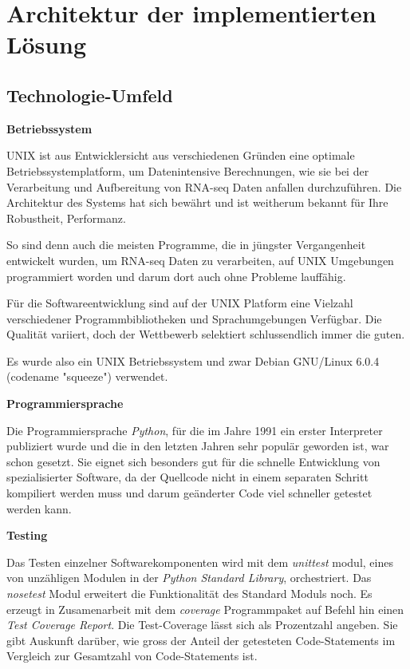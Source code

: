 \documentclass[a4paper]{thesis}
\begin{document}
\section{Architektur der implementierten Lösung}

\subsection{Technologie-Umfeld}

\textbf{Betriebssystem}

UNIX ist aus Entwicklersicht aus verschiedenen Gründen eine optimale
Betriebssystemplatform, um Datenintensive Berechnungen, wie sie bei
der Verarbeitung und Aufbereitung von RNA-seq Daten anfallen durchzuführen.
Die Architektur des Systems hat sich bewährt und ist weitherum bekannt
für Ihre Robustheit, Performanz.

So sind denn auch die meisten Programme, die in jüngster Vergangenheit
entwickelt wurden, um RNA-seq Daten zu verarbeiten, auf UNIX Umgebungen
programmiert worden und darum dort auch ohne Probleme lauffähig.

Für die Softwareentwicklung sind auf der UNIX Platform
eine Vielzahl verschiedener Programmbibliotheken und Sprachumgebungen
Verfügbar. Die Qualität variiert, doch der Wettbewerb selektiert
schlussendlich immer die guten.

Es wurde also ein UNIX Betriebssystem und zwar Debian GNU/Linux 6.0.4
(codename "squeeze") verwendet.

\textbf{Programmiersprache}

Die Programmiersprache {\em Python}, für die im Jahre 1991 ein erster
Interpreter publiziert wurde und die in den letzten Jahren sehr
populär geworden ist, war schon gesetzt. Sie eignet sich besonders gut
für die schnelle Entwicklung von spezialisierter Software, da der
Quellcode nicht in einem separaten Schritt kompiliert werden muss und
darum geänderter Code viel schneller getestet werden kann.

\textbf{Testing}

Das Testen einzelner Softwarekomponenten wird mit dem {\em unittest} modul,
eines von unzähligen Modulen in der {\em Python Standard Library},
orchestriert. Das {\em nosetest} Modul erweitert die Funktionalität
des Standard Moduls noch. Es erzeugt in Zusamenarbeit mit dem {\em coverage}
Programmpaket auf Befehl hin einen {\em Test Coverage Report}. Die
Test-Coverage lässt sich als Prozentzahl angeben. Sie gibt Auskunft darüber,
wie gross der Anteil der getesteten Code-Statements im Vergleich zur Gesamtzahl
von Code-Statements ist.
\end{document}
